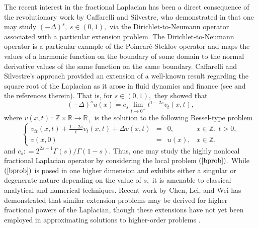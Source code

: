 \documentclass[final,1p,times]{elsarticle}
\def\ZZ{\mathbb Z} %
\def\RR{\mathbb R} %
\def\l{\left}
\def\r{\right}
\newcommand{\bb}[1]{\begin{equation}\label{#1}}
\newcommand{\ee}{\end{equation}}
\def\R#1{$(\ref{#1})$}
\theoremstyle{remark}
\theoremstyle{definition}
\begin{document}
The recent interest in the fractional Laplacian has been a direct consequence of the revolutionary work by Caffarelli and Silvestre, who demonstrated in \cite{doi:10.1080/03605300600987306} that one may study $(-\Delta)^s,\ s\in(0,1),$ via the Dirichlet-to-Neumann operator associated with a particular extension problem. The Dirichlet-to-Neumann operator is a particular example of the Poincar{\'e}-Steklov operator and maps the values of a harmonic function on the boundary of some domain to the normal derivative values
of the same function on the same boundary.
Caffarelli and Silvestre's approach provided an extension of a well-known result regarding the square root of the Laplacian as it arose in fluid dynamics and finance (see \cite{cabre2010positive} and the references therein). That is, for $s\in (0,1),$ they showed that
\bb{dlap1}
(-\Delta)^su(x) = c_s \lim_{t\to 0^+} t^{1-2s}v_t(x,t),
\ee
where $v(x,t)\,:\,\ZZ\times \RR \to \RR_+$ is the solution to the following Bessel-type problem
\bb{bprob}
\l\{\begin{array}{rcll}
v_{tt}(x,t) + \frac{1-2s}{t}v_t(x,t) + \Delta v(x,t) & = & 0 , & x\in\ZZ,\ t > 0,\\
v(x,0) & = & u(x), & x\in \ZZ,
\end{array}\r.
\ee
and $c_s \mathrel{\mathop:}= 2^{2s-1}\Gamma(s)/\Gamma(1-s).$ Thus, one may study the highly nonlocal fractional Laplacian operator by considering the local problem \R{bprob}. While \R{bprob} is posed in one higher dimension and exhibits either a singular or degenerate nature depending on the value of $s,$ it is amenable to classical analytical and numerical techniques. Recent work by Chen, Lei, and Wei has demonstrated that similar extension problems may be derived for higher fractional powers of the Laplacian, though these extensions have not yet been employed in approximating solutions to higher-order problems \cite{Chen2018}.


\end{document}
